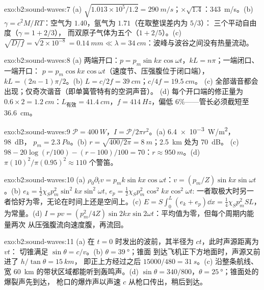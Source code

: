 \begin{solution}{exo:b2:sound-waves:7}
(a) $\sqrt{1.013 \times 10^5/1.2} = \qty{290}{m/s}$；$\times\sqrt{1.4}$：\qty{343}{m/s}。(b)
$\gamma = c^2M/RT$：空气为 $1.40$，氩气为 $1.71$（在取整误差内为 $5/3$）：
三个平动自由度（$\gamma = 1 + 2/3$），
而双原子气体为五个（$1 + 2/5$）。(c) $\sqrt{D/f} = \sqrt{2 \times 10^{-8}} = \qty{0.14}{mm}
\ll \lambda = \qty{34}{cm}$：波峰与波谷之间没有热量流动。
\end{solution}

\begin{solution}{exo:b2:sound-waves:8}
(a) 两端开口：$p = p_m\sin kx\cos\omega t$，$kL = n\pi$；一端闭口、一端开口：
$p = p_m\cos kx\cos\omega t$（速度节、压强腹位于闭口端），
$kL = (2n - 1)\pi/2$。(b) $L = c/2f = \qty{39}{cm}$；$c/4f = \qty{19.5}{cm}$。
(c) 全部谐音都会出现；仅奇次谐音（即单簧管特有的空洞声音）。
(d) 每个开口端的修正量为 $0.6 \times 2 = \qty{1.2}{cm}$：$L_{\text{有效}} = \qty{41.4}{cm}$，$f =
\qty{414}{Hz}$，偏低 $6\%$——管长必须截短至 \qty{36.6}{cm}。
\end{solution}

\begin{solution}{exo:b2:sound-waves:9}
$\mathcal P = \qty{400}{W}$，$I = \mathcal P/2\pi r^2$。(a) \qty{6.4e-3}{W/m^2}，\qty{98}{dB}，
$p_m = \qty{2.3}{Pa}$。(b) $r = \sqrt{400/2\pi} = \qty{8}{m}$；\qty{2.5}{km} 处为 \qty{70}{dB}。
(c) $98 - 20\log(r/100) - (r - 100)/100 = 70$：$r \approx \qty{950}{m}$。(d)
$\pi(10)^2/\pi(0.95)^2 \approx 110$ 个警笛。
\end{solution}

\begin{solution}{exo:b2:sound-waves:10}
(a) $\rho_0\partial_tv = p_mk\sin kx\cos\omega t$：$v = (p_m/Z)\sin kx\sin\omega t$。(b)
$e_k = \tfrac12\chi_Sp_m^2\sin^2kx\sin^2\omega t$, $e_p = \tfrac12\chi_Sp_m^2\cos^2kx\cos^2\omega t$:
一者取极大时另一者恰好为零，无论在时间上还是空间上。(c) $E =
S\int_0^L(e_k + e_p)\dd x = \tfrac14\chi_Sp_m^2SL$，为常量。(d) $I = pv =
(p_m^2/4Z)\sin2kx\sin2\omega t$：平均值为零，但每个周期内能量两次
从压强腹流向速度腹，再流回。
\end{solution}

\begin{solution}{exo:b2:sound-waves:11}
(a) 在 $t = 0$ 时发出的波前，其半径为 $ct$，此时声源距离为 $vt$：
切锥满足 $\sin\theta = c/v$。(b) $\theta = \qty{39}{\degree}$；锥面
到达飞机正下方地面时，声源又前进了 $h/\tan\theta = \qty{15}{km}$，
即正上方经过之后 $15000/480 = \qty{31}{s}$。(c) 沿整条航线、
宽 \qty{60}{km} 的带状区域都能听到轰鸣声。(d) $\sin\theta
= 340/800$，$\theta = \qty{25}{\degree}$；锥面处的爆裂声先到达，
枪口的爆炸声以声速 $c$ 从枪口传出，稍后到达。
\end{solution}

